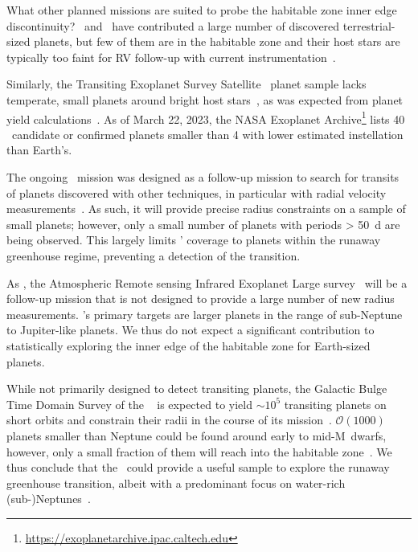\documentclass[twocolumn,twocolappendix]{aastex631}
\begin{document}
What other planned missions are suited to probe the habitable zone inner edge discontinuity?
\kepler\ and \ktwo\ have contributed a large number of discovered terrestrial-sized planets, but few of them are in the habitable zone and their host stars are typically too faint for RV follow-up with current instrumentation~\citep{Dressing2015}.

Similarly, the Transiting Exoplanet Survey Satellite~\citep[\tess,][]{Ricker2014a} planet sample lacks temperate, small planets around bright host stars~\citep{Ment2023}, as was expected from planet yield calculations~\citep{Barclay2018}.
As of March 22, 2023, the NASA Exoplanet Archive\footnote{\url{https://exoplanetarchive.ipac.caltech.edu}} lists 40 \tess\ candidate or confirmed planets smaller than \SI{4}{\rEarth} with lower estimated instellation than Earth's.

The ongoing \cheops\ mission was designed as a follow-up mission to search for transits of planets discovered with other techniques, in particular with radial velocity measurements~\citep{Benz2021}.
As such, it will provide precise radius constraints on a sample of small planets; however, only a small number of planets with periods \SI{> 50}{\day} are being observed.
This largely limits \cheops' coverage to planets within the runaway greenhouse regime, preventing a detection of the transition.

As \cheops, the Atmospheric Remote sensing Infrared Exoplanet Large survey~\citep[\ariel,][]{Puig2016} will be a follow-up mission that is not designed to provide a large number of new radius measurements.
\ariel's primary targets are larger planets in the range of sub-Neptune to Jupiter-like planets.
We thus do not expect a significant contribution to statistically exploring the inner edge of the habitable zone for Earth-sized planets.

While not primarily designed to detect transiting planets, the Galactic Bulge Time Domain Survey of the \rst~\citep{Spergel2015} is expected to yield $\sim 10^5$ transiting planets on short orbits and constrain their radii in the course of its mission~\citep{Montet2017}.
$\mathcal{O} (1000)$ planets smaller than Neptune could be found around early to mid-M~dwarfs, however, only a small fraction of them will reach into the habitable zone~\citep{Tamburo2023}.
We thus conclude that the \rst\ could provide a useful sample to explore the runaway greenhouse transition, albeit with a predominant focus on water-rich (sub-)Neptunes~\citep[e.g.,][]{Pierrehumbert2022}.
\end{document}
